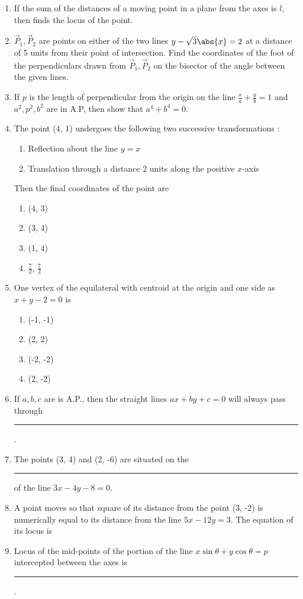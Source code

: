 \begin{enumerate}[label=\thesubsection.\arabic*, ref=\thesubsection.\theenumi]
\item If the sum of the distances of a moving point in a plane from the axes is $l$,  then finds the locus of the point.  
\item $\vec{P}_1, \vec{P}_2$ are points on either of the two lines $y-\sqrt{3}\abs{x}=2$ at a distance of 5 units from their point of intersection. Find the coordinates of the foot of the perpendiculars drawn from $\vec{P}_1,  \vec{P}_2$ on the bisector of the angle between the given lines.
\item If $p$ is the length of perpendicular from the origin on the line $\frac{x}{a}+\frac{y}{b}=1$ and $a^2, p^2, b^2$ are in A.P,  then show that $a^4+b^4=0$.
\item The point (4, 1) undergoes the following two successive transformations :
\begin{enumerate}
\item Reflection about the line $y=x$
\item Translation through a distance 2 units along the positive $x$-axis 
\end{enumerate}
Then the final coordinates of the point are
\begin{enumerate}
\item (4, 3)
\item (3, 4)
\item (1, 4)
\item $\frac{7}{2}$, $\frac{7}{2}$
\end{enumerate}
\item One vertex of the equilateral with centroid at the origin and one side as $x+y-2=0$ is
\begin{enumerate}
\item (-1, -1)
\item (2, 2)
\item (-2, -2)
\item (2, -2)
\end{enumerate}
\item If $a, b, c$ are is A.P.,  then the straight lines $ax+by+c=0$ will always pass through \rule{1cm}{0.15mm}.
\item The points (3, 4) and (2, -6) are situated on the \rule{1cm}{0.15mm} of the line $3x-4y-8=0$.
\item A point moves so that square of its distance from the point (3, -2) is numerically equal to its distance from the line $5x-12y=3$. The equation of its locus is %
\item Locus of the mid-points of the portion of the line $x\sin\theta+y\cos\theta=p$ intercepted between the axes is \rule{1cm}{0.15mm}.


\end{enumerate}
